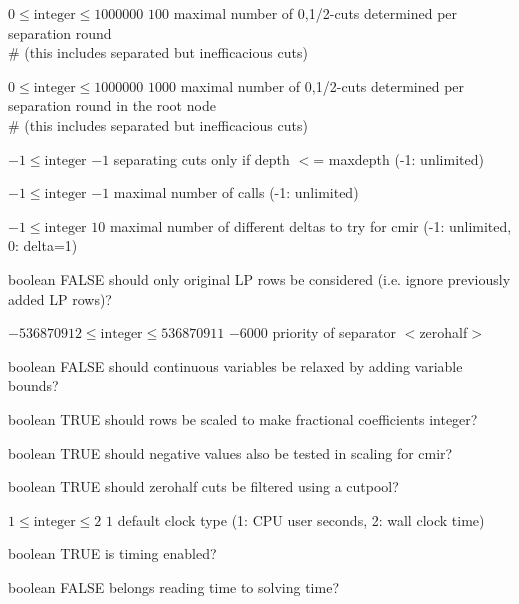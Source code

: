 %
{$0\leq\textrm{integer}\leq1000000$}%
{$100$}%
{maximal number of {0,1/2}-cuts determined per separation round\\   \#                      (this includes separated but inefficacious cuts)}%
{}

%
{$0\leq\textrm{integer}\leq1000000$}%
{$1000$}%
{maximal number of {0,1/2}-cuts determined per separation round in the root node\\   \#                      (this includes separated but inefficacious cuts)}%
{}

%
{$-1\leq\textrm{integer}$}%
{$-1$}%
{separating cuts only if depth $<$= maxdepth (-1: unlimited)}%
{}

%
{$-1\leq\textrm{integer}$}%
{$-1$}%
{maximal number of calls (-1: unlimited)}%
{}

%
{$-1\leq\textrm{integer}$}%
{$10$}%
{maximal number of different deltas to try for cmir (-1: unlimited, 0: delta=1)}%
{}

%
{boolean}%
{FALSE}%
{should only original LP rows be considered (i.e. ignore previously added LP rows)?}%
{}

%
{$-536870912\leq\textrm{integer}\leq536870911$}%
{$-6000$}%
{priority of separator $<$zerohalf$>$}%
{}

%
{boolean}%
{FALSE}%
{should continuous variables be relaxed by adding variable bounds?}%
{}

%
{boolean}%
{TRUE}%
{should rows be scaled to make fractional coefficients integer?}%
{}

%
{boolean}%
{TRUE}%
{should negative values also be tested in scaling for cmir?}%
{}

%
{boolean}%
{TRUE}%
{should zerohalf cuts be filtered using a cutpool?}%
{}

%
{$1\leq\textrm{integer}\leq2$}%
{$1$}%
{default clock type (1: CPU user seconds, 2: wall clock time)}%
{}

%
{boolean}%
{TRUE}%
{is timing enabled?}%
{}

%
{boolean}%
{FALSE}%
{belongs reading time to solving time?}%
{}

